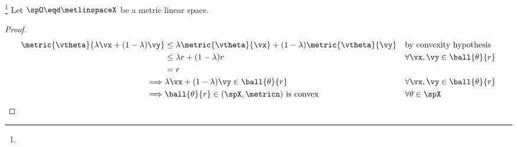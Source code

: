\begin{theorem}
\label{thm:vsm_convex}
\footnote{
  }
Let $\spO\eqd\metlinspaceX$ be a metric linear space.
\end{theorem}
\begin{proof}
\begin{align*}
  \metric{\vtheta}{\lambda\vx+(1-\lambda)\vy}
    &\le \lambda\metric{\vtheta}{\vx} + (1-\lambda)\metric{\vtheta}{\vy}
    &&   \text{by convexity hypothesis}
  \\&\le   \lambda r  + (1-\lambda) r
    &&   \forall \vx,\vy\in\ball{\theta}{r}
  \\&=   r
  \\\implies & \lambda\vx+(1-\lambda)\vy \in \ball{\theta}{r}
    &&   \forall \vx,\vy\in\ball{\theta}{r}
  \\\implies & \ball{\theta}{r} \in(\spX,\metricn) \text{ is convex}
    &&   \forall \theta\in\spX
\end{align*}
\end{proof}


